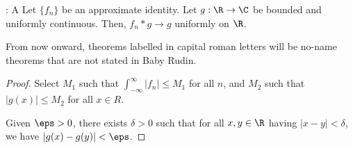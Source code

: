 \begin{ntheorem}{: A}
	Let \(\{f_n\}\) be an approximate identity. Let \(g:\R\to\C\) be bounded and uniformly continuous. Then, \(f_n\ast g\to g\) uniformly on \(\R\).
\end{ntheorem}
\begin{notation}
	From now onward, theorems labelled in capital roman letters will be no-name theorems that are not stated in Baby Rudin.
\end{notation}
\begin{proof}
	Select \(M_1\) such that \(\displaystyle\int_{-\infty}^{\infty}|f_n|\leq M_1\) for all \(n\), and \(M_2\) such that \(|g(x)|\leq M_2\) for all \(x\in R\).
	
	\medskip
	
	Given \(\eps>0\), there exists \(\delta>0\) such that for all \(x,y\in\R\) having \(|x-y|<\delta\), we have \(|g(x)-g(y)|<\eps\).
	
	\medskip
	

\end{proof}
